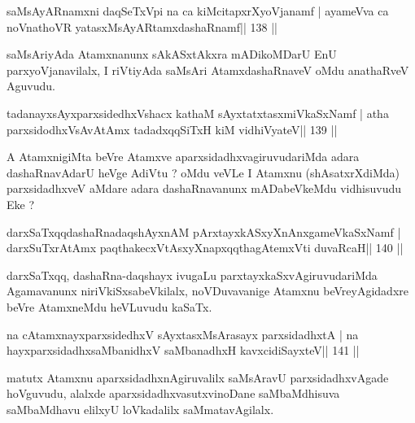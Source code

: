 
\begin{shl}
saMsAyARnamxni daqSeTxV\s pi na ca kiMcitapxrXyoVjanamf |
ayameVva ca noV\s nathoVR yatasxMsAyARtamxdashaRnamf\hfill || 138 ||
\end{shl}

\begin{artha}
saMsAriyAda Atamxnanunx sAkASxtAkxra mADikoMDarU EnU parxyoVjanavilalx, I riVtiyAda saMsAri AtamxdashaRnaveV oMdu anathaRveV Aguvudu.
\end{artha}


\begin{shl}
tadanayxsAyxparxsidedhxVshacx kathaM sAyxtatxtasxmiVkaSxNamf |
atha parxsidodhxV\s sAvAtAmx tadadxqqSiTxH kiM vidhiVyateV\hfill || 139 ||
\end{shl}

\begin{artha}
A AtamxnigiMta beVre Atamxve aparxsidadhxvagiruvudariMda adara dashaRnavAdarU heVge AdiVtu ? oMdu veVLe I Atamxnu (shAsatxrXdiMda) parxsidadhxveV aMdare adara dashaRnavanunx mADabeVkeMdu vidhisuvudu Eke ? 
\end{artha}


\begin{shl}
darxSaTxqqdashaRnadaqshAyxnAM pArxtayxkASxyXnAnx\s\s gameVkaSxNamf |
darxSuTxrAtAmx paqthakecxVtAsxyXnapxqqthagAtemxVti duvaRcaH\hfill || 140 ||
\end{shl}

\begin{artha}
darxSaTxqq, dashaRna-daqshayx ivugaLu parxtayxkaSxvAgiruvudariMda Agamavanunx niriVkiSxsa\-beVkilalx, noVDuvavanige Atamxnu beVreyAgidadxre beVre AtamxneMdu heVLuvudu \footnotemark[5]kaSaTx.
\end{artha}

\begin{shl}
na cA\s\s tamxnayxparxsidedhxV sAyxtasxMsArasayx parxsidadhxtA |
na hayxparxsidadhxsaMbanidhxV saMbanadhxH kavxcidiSayxteV\hfill || 141 ||
\end{shl}

\begin{artha}
matutx Atamxnu aparxsidadhxnAgiruvalilx saMsAravU parxsidadhxvAgade hoVguvudu, alalxde aparxsidadhxvasutxvinoDane saMbaMdhisuva saMbaMdhavu elilxyU loVkadalilx saMmatavAgilalx.
\end{artha}

